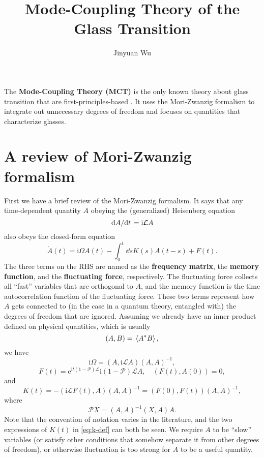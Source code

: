 \documentclass[hyperref, a4paper]{article}
\title{Mode-Coupling Theory of the Glass Transition}
\author{Jinyuan Wu}
\newcommand*{\ii}{\mathrm{i}}
\newcommand*{\ee}{\mathrm{e}}
\newcommand*{\concept}[1]{{\textbf{#1}}}
\begin{document}
\maketitle

The \concept{Mode-Coupling Theory (MCT)} is the only known theory about glass transition that are
first-principles-based \cite{mct2005,mct-primer}. It uses the Mori-Zwanzig formalism 
\cite{MoriZwanzigformalismWikipedia} to integrate out unnecessary degrees of freedom and focuses 
on quantities that characterize glasses.

\section{A review of Mori-Zwanzig formalism}

First we have a brief review of the Mori-Zwanzig formalism. 
It says that any time-dependent quantity $A$ obeying the (generalized) Heisenberg equation 
\begin{equation}
    \dv*{A}{t} = \ii \mathcal{L} A
\end{equation}
also obeys the closed-form equation
\begin{equation}
    {\dot {A}}(t)= \ii \Omega A(t) - \int _{0}^{t} \dd{s} K(s)A(t-s)+F(t).
    \label{eq:closed-form-a}
\end{equation}
The three terms on the RHS are named as the \concept{frequency matrix}, the \concept{memory function}, 
and the \concept{fluctuating force}, respectively. The fluctuating force collects all ``fast'' variables that 
are orthogonal to $A$, and the memory function is the time autocorrelation function of the fluctuating force.
These two terms represent how $A$ gets connected to (in the case in a quantum theory, entangled with) the degrees of
freedom that are ignored. 
Assuming we already have an inner product defined on physical quantities, which is usually 
\begin{equation}
    (A, B) = \expval*{A^* B},
    \label{eq:inner-product-def}
\end{equation}
we have 
\begin{equation}
    \ii \Omega =(A, \ii \mathcal{L} A)(A,A)^{-1},
\end{equation}
\begin{equation}
    F(t)=\ee^{\ii t(1-\mathcal{P}) \mathcal{L}}\ii (1-\mathcal{P}) \mathcal{L} A, \quad (F(t), A(0)) = 0,
\end{equation}
and 
\begin{equation}
    K(t)=- (\ii \mathcal{L} F(t),A)(A,A)^{-1} = (F(0), F(t)) (A,A)^{-1},
    \label{eq:k-def}
\end{equation}
where 
\begin{equation}
    \mathcal{P} X=(A,A)^{-1}(X,A)A.
\end{equation}
Note that the convention of notation varies in the literature, and the two expressions of $K(t)$ in \eqref{eq:k-def}
can both be seen. We require $A$ to be ``slow'' variables (or satisfy other conditions that somehow separate it 
from other degrees of freedom), or otherwise fluctuation is too strong for $A$ to be a useful quantity.
\end{document}
